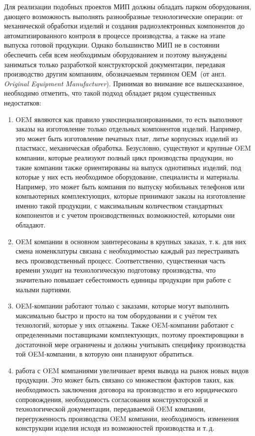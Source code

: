 Для реализации подобных проектов МИП должны обладать парком оборудования, дающего возможность выполнять разнообразные технологические операции: от механической обработки изделий и создания радиоэлектронных компонентов до автоматизированного контроля в процессе производства, а также на этапе выпуска готовой продукции. Однако большинство МИП не в состоянии обеспечить себя всем необходимым оборудованием и поэтому вынуждены заниматься только разработкой конструкторской документации, передавая производство другим компаниям, обозначаемым термином ОЕМ~(от англ. \textit{Original Equipment Manufacturer}). Принимая во внимание все вышесказанное, необходимо отметить, что такой подход обладает рядом существенных недостатков:

\begin{enumerate}
	\item OEM являются как правило узкоспециализированными, то есть выполняют заказы на изготовление только отдельных компонентов изделий. Например, это может быть изготовление печатных плат, литье корпусных изделий из пластмасс, механическая обработка. Безусловно, существуют и крупные OEM компании, которые реализуют полный цикл производства продукции, но такие компании также ориентированы на выпуск однотипных изделий, под которые у них есть необходимое оборудование, специалисты и материалы. Например, это может быть компания по выпуску мобильных телефонов или компьютерных комплектующих, которые принимают заказы на изготовление именно такой продукции, с максимальным количеством стандартных компонентов и с учетом производственных возможностей, которыми они обладают.
	\item OEM компании в основном заинтересованы в крупных заказах, т.\,к. для них смена номенклатуры связана с необходимостью каждый раз перестраивать весь производственный процесс. Соответственно, существенная часть времени уходит на технологическую подготовку производства, что значительно повышает себестоимость единицы продукции при работе с малыми партиями. 
	\item OEM-компании работают только с заказами, которые могут выполнить максимально быстро и просто на том оборудовании и с учётом тех технологий, которые у них отлажены. Также OEM-компании работают с определенными поставщиками комплектующих, поэтому проектировщики в достаточной мере ограничены и должны учитывать специфику производства той OEM-компании, в которую они планируют обратиться.
	\item работа с OEM компаниями увеличивает время вывода на рынок новых видов продукции. Это может быть связано со множеством факторов таких, как необходимость заключения договора на производство и его юридического сопровождения, необходимость согласования конструкторской и технологической документации, передаваемой OEM компании, перегруженность производства OEM компании, необходимость изменения конструкции изделия исходя из возможностей производства и т.\,д.

\end{enumerate}
